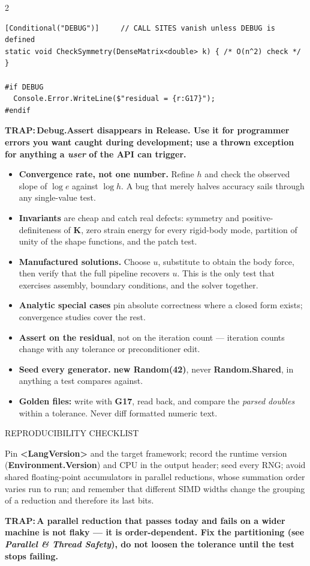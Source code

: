 \documentclass[9pt,a4paper]{extarticle}
\newenvironment{card}[3][acBlue]{%
  \begin{tcolorbox}[
    enhanced, colback=#2, colframe=bdCard,
    coltitle=black, colbacktitle=#2!70!bgHdr,
    fonttitle=\bfseries\fontsize{6.16pt}{7.48pt}\selectfont\MakeUppercase,
    title={#3},
    left=3pt, right=2pt, top=1.4pt, bottom=1.8pt,
    toptitle=1pt, bottomtitle=1pt,
    boxrule=0.4pt,
    borderline west={3pt}{0pt}{#1},
    arc=2pt, before skip=0pt, after skip=1.6mm,
    breakable, toprule at break=0pt, bottomrule at break=0pt,
  ]}{\end{tcolorbox}}
\newcommand{\sub}[1]{%
  \par\vspace{1.5pt}%
  {\fontsize{5.7pt}{7pt}\selectfont\color{gray}\MakeUppercase{#1}}\par
  \vspace{0.5pt}}
\newcommand{\code}[1]{{\ttfamily\bfseries #1}}
\newcommand{\trap}[1]{\par\noindent
  \begin{minipage}{\linewidth}%
  {\fontsize{5.6pt}{6.8pt}\selectfont\color{trap}\bfseries TRAP:\,#1}%
  \end{minipage}\par}
\begin{document}
\begin{multicols}{2}
\begin{card}[acGreen]{bgGreen}{Unit Tests for Numerical Code}
\begin{lstlisting}[style=cs]
[Conditional("DEBUG")]     // CALL SITES vanish unless DEBUG is defined
static void CheckSymmetry(DenseMatrix<double> k) { /* O(n^2) check */ }

#if DEBUG
  Console.Error.WriteLine($"residual = {r:G17}");
#endif
\end{lstlisting}
\trap{\code{Debug.Assert} disappears in Release. Use it for programmer
errors you want caught during development; use a thrown exception for
anything a \emph{user} of the API can trigger.}
\end{card}

\begin{card}[acRed]{bgRed}{What to Test in a Solver}
\begin{itemize}
\item \textbf{Convergence rate, not one number.} Refine $h$ and check the
  observed slope of $\log e$ against $\log h$. A bug that merely halves
  accuracy sails through any single-value test.
\item \textbf{Invariants} are cheap and catch real defects: symmetry and
  positive-definiteness of $\mathbf{K}$, zero strain energy for every
  rigid-body mode, partition of unity of the shape functions, and the
  patch test.
\item \textbf{Manufactured solutions.} Choose $u$, substitute to obtain the
  body force, then verify that the full pipeline recovers $u$. This is the
  only test that exercises assembly, boundary conditions, and the solver
  together.
\item \textbf{Analytic special cases} pin absolute correctness where a
  closed form exists; convergence studies cover the rest.
\item \textbf{Assert on the residual}, not on the iteration count ---
  iteration counts change with any tolerance or preconditioner edit.
\item \textbf{Seed every generator.} \code{new Random(42)}, never
  \code{Random.Shared}, in anything a test compares against.
\item \textbf{Golden files:} write with \code{G17}, read back, and compare
  the \emph{parsed doubles} within a tolerance. Never diff formatted
  numeric text.
\end{itemize}
\sub{Reproducibility checklist}
{\fontsize{6.0pt}{7.5pt}\selectfont
Pin \code{<LangVersion>} and the target framework; record the runtime version
(\code{Environment.Version}) and CPU in the output header; seed every RNG;
avoid shared floating-point accumulators in parallel reductions, whose
summation order varies run to run; and remember that different SIMD widths
change the grouping of a reduction and therefore its last bits.}
\trap{A parallel reduction that passes today and fails on a wider machine is
not flaky --- it is order-dependent. Fix the partitioning (see
\emph{Parallel \& Thread Safety}), do not loosen the tolerance until the
test stops failing.}
\end{card}

\end{multicols}
\end{document}
